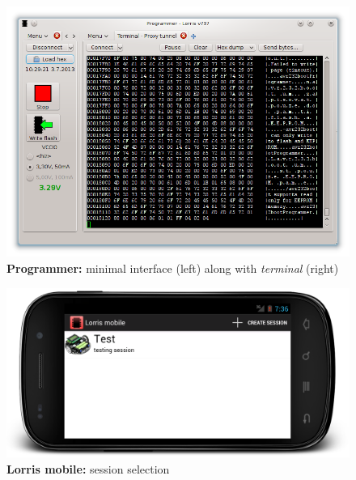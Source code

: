 \documentclass[12pt, a4paper, oneside]{article}
\newcommand{\B}{\textbf} %
\newcommand{\It}{\textit}  %
\begin{document}
\begin{figure}[H]
\begin{center}
\includegraphics[width=\textwidth-30pt]{../img/programmer_mini.png}
\caption{\B{Programmer:} minimal interface (left) along with \It{terminal} (right)}
\label{prog_mini}
\end{center}
\end{figure}

\begin{figure}[H]
\begin{center}
\includegraphics[width=\textwidth]{../img/mobile_session.png}
\caption{\B{Lorris mobile:} session selection}
\label{mobile_session}
\end{center}
\end{figure}
\end{document}
